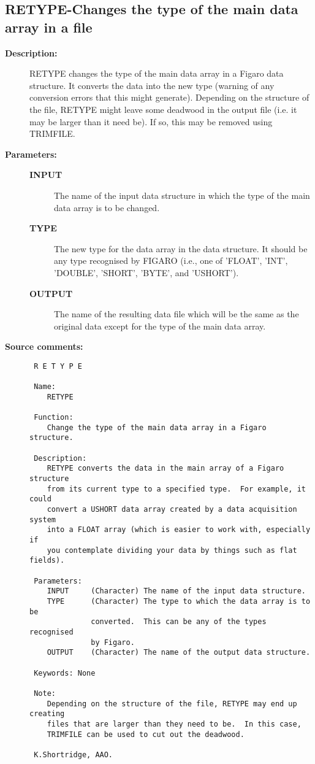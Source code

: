 \subsection{RETYPE-\label{RETYPE}Changes the type of the main data array in a file}
\begin{description}

\item [{\bf Description:}]
 RETYPE changes the type of the main data array in a Figaro data
 structure.  It converts the data into the new type (warning of
 any conversion errors that this might generate).  Depending on
 the structure of the file, RETYPE might leave some deadwood in
 the output file (i.e. it may be larger than it need be).  If so,
 this may be removed using TRIMFILE.

\item [{\bf Parameters:}]
\begin{description}
\item [{\bf INPUT}]
 The name of the input data structure in which the
 type of the main data array is to be changed.
\item [{\bf TYPE}]
 The new type for the data array in the data structure.
 It should be any type recognised by FIGARO (i.e., one
 of 'FLOAT', 'INT', 'DOUBLE', 'SHORT', 'BYTE', and
 'USHORT').
\item [{\bf OUTPUT}]
 The name of the resulting data file which will
 be the same as the original data except for the
 type of the main data array.
\end{description}

\item [{\bf Source comments:}]
\begin{verbatim}
 R E T Y P E

 Name:
    RETYPE

 Function:
    Change the type of the main data array in a Figaro structure.

 Description:
    RETYPE converts the data in the main array of a Figaro structure
    from its current type to a specified type.  For example, it could
    convert a USHORT data array created by a data acquisition system
    into a FLOAT array (which is easier to work with, especially if
    you contemplate dividing your data by things such as flat fields).

 Parameters:
    INPUT     (Character) The name of the input data structure.
    TYPE      (Character) The type to which the data array is to be
              converted.  This can be any of the types recognised
              by Figaro.
    OUTPUT    (Character) The name of the output data structure.

 Keywords: None

 Note:
    Depending on the structure of the file, RETYPE may end up creating
    files that are larger than they need to be.  In this case,
    TRIMFILE can be used to cut out the deadwood.

 K.Shortridge, AAO.
\end{verbatim}
\end{description}
